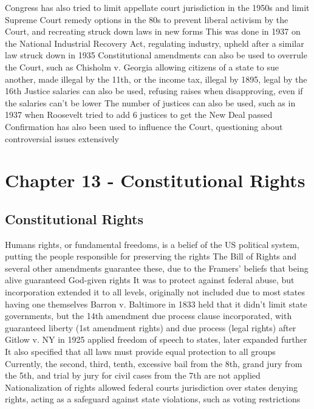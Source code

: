 \documentclass[11 pt, twoside]{article}
\newenvironment{outline*}
{
	\begin{outline}[enumerate]
	}
	{\end{outline}
}
\begin{document}
\begin{outline*}
\2 Congress has also tried to limit appellate court jurisdiction in the 1950s and limit Supreme Court remedy options in the 80s to prevent liberal activism by the Court, and recreating struck down laws in new forms
\2 This was done in 1937 on the National Industrial Recovery Act, regulating industry, upheld after a similar law struck down in 1935
\2 Constitutional amendments can also be used to overrule the Court, such as Chisholm v. Georgia allowing citizens of a state to sue another, made illegal by the 11th, or the income tax, illegal by 1895, legal by the 16th
\2 Justice salaries can also be used, refusing raises when disapproving, even if the salaries can’t be lower
\2 The number of justices can also be used, such as in 1937 when Roosevelt tried to add 6 justices to get the New Deal passed
\2 Confirmation has also been used to influence the Court, questioning about controversial issues extensively
\end{outline*}
\section{Chapter 13 - Constitutional Rights}
\subsection{Constitutional Rights}
\begin{outline*}
\1 Humans rights, or fundamental freedoms, is a belief of the US political system, putting the people responsible for preserving the rights
\2 The Bill of Rights and several other amendments guarantee these, due to the Framers’ beliefs that being alive guaranteed God-given rights
\1 It was to protect against federal abuse, but incorporation extended it to all levels, originally not included due to most states having one themselves
\2 Barron v. Baltimore in 1833 held that it didn’t limit state governments, but the 14th amendment due process clause incorporated, with guaranteed liberty (1st amendment rights) and due process (legal rights) after Gitlow v. NY in 1925 applied freedom of speech to states, later expanded further
\2 It also specified that all laws must provide equal protection to all groups
\2 Currently, the second, third, tenth, excessive bail from the 8th, grand jury from the 5th, and trial by jury for civil cases from the 7th are not applied
\1 Nationalization of rights allowed federal courts jurisdiction over states denying rights, acting as a safeguard against state violations, such as voting restrictions
\end{outline*}
\end{document}
